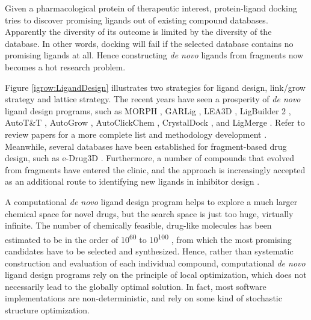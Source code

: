 Given a pharmacological protein of therapeutic interest, protein-ligand docking tries to discover promising ligands out of existing compound databases. Apparently the diversity of its outcome is limited by the diversity of the database. In other words, docking will fail if the selected database contains no promising ligands at all. Hence constructing \textit{de novo} ligands from fragments now becomes a hot research problem.

Figure \ref{igrow:LigandDesign} \citep{363} illustrates two strategies for ligand design, link/grow strategy and lattice strategy. The recent years have seen a prosperity of \textit{de novo} ligand design programs, such as MORPH \citep{365}, GARLig \citep{471}, LEA3D \citep{1223}, LigBuilder 2 \citep{749}, AutoT\&T \citep{780}, AutoGrow \citep{466}, AutoClickChem \citep{1051}, CrystalDock \citep{954}, and LigMerge \citep{1181}. Refer to review papers for a more complete list \citep{363,367,472,1006} and methodology development \citep{470,982}. Meanwhile, several databases have been established for fragment-based drug design, such as e-Drug3D \citep{1125}. Furthermore, a number of compounds that evolved from fragments have entered the clinic, and the approach is increasingly accepted as an additional route to identifying new ligands in inhibitor design \citep{363,367,472,474,1006}.

A computational \textit{de novo} ligand design program helps to explore a much larger chemical space for novel drugs, but the search space is just too huge, virtually infinite. The number of chemically feasible, drug-like molecules has been estimated to be in the order of 10\textsuperscript{60} to 10\textsuperscript{100} \citep{1104}, from which the most promising candidates have to be selected and synthesized. Hence, rather than systematic construction and evaluation of each individual compound, computational \textit{de novo} ligand design programs rely on the principle of local optimization, which does not necessarily lead to the globally optimal solution. In fact, most software implementations are non-deterministic, and rely on some kind of stochastic structure optimization.

